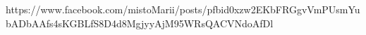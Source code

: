  
 
 
 
 

https://www.facebook.com/mistoMarii/posts/pfbid0xzw2EKbFRGgvVmPUsmYubADbAAfs4sKGBLfS8D4d8MgjyyAjM95WRsQACVNdoAfDl
